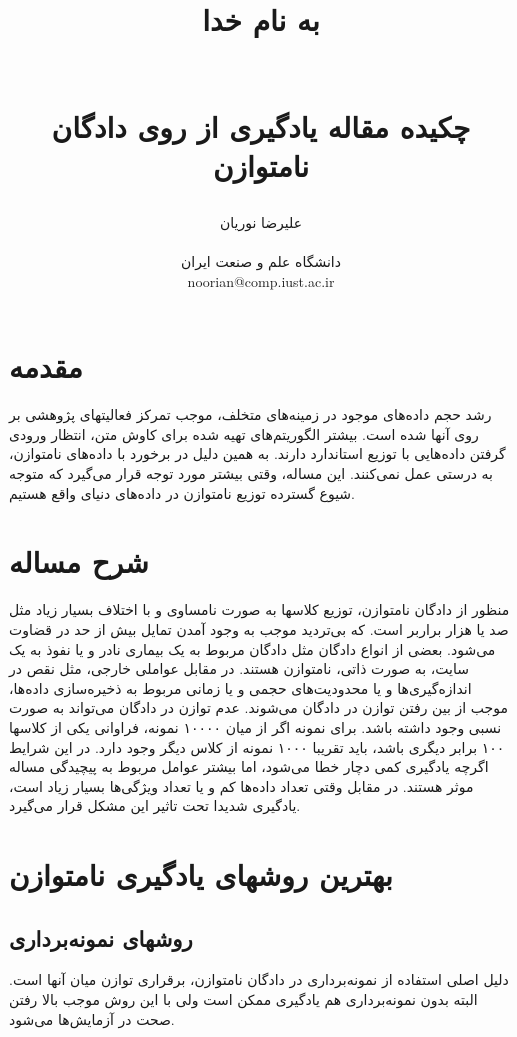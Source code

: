 \documentclass{article}
\title{ 
\begin{normalsize} به نام خدا \end{normalsize}
\\[7cm]
چکیده مقاله یادگیری از روی دادگان نامتوازن
\\[3cm]
}
\author{علیرضا نوریان
\\
\\ \small دانشگاه علم و صنعت ایران
\\ \small noorian@comp.iust.ac.ir
}
\begin{document}
\maketitle

\tableofcontents

\begin{abstract}

\end{abstract}

\section{مقدمه}
رشد حجم داده‌های موجود در زمینه‌های متخلف، موجب تمرکز فعالیتهای پژوهشی بر روی آنها شده است. بیشتر الگوریتم‌های تهیه شده برای کاوش متن، انتظار ورودی گرفتن داده‌هایی با توزیع استاندارد دارند. به همین دلیل در برخورد با داده‌های نامتوازن، به درستی عمل نمی‌کنند. این مساله، وقتی بیشتر مورد توجه قرار می‌گیرد که متوجه شیوع گسترده توزیع نامتوازن در داده‌های دنیای واقع هستیم.
\section{شرح مساله}
منظور از دادگان نامتوازن، توزیع کلاسها به صورت نامساوی و با اختلاف بسیار  زیاد مثل صد یا هزار براربر است. که بی‌تردید موجب به وجود آمدن تمایل بیش از حد در قضاوت می‌شود. بعضی از انواع دادگان مثل دادگان مربوط به یک بیماری نادر و یا نفوذ به یک سایت، به صورت ذاتی، نامتوازن هستند. در مقابل عواملی خارجی، مثل نقص در اندازه‌گیری‌ها و یا محدودیت‌های حجمی و یا زمانی مربوط به ذخیره‌سازی داده‌ها، موجب از بین رفتن توازن در دادگان می‌شوند.
عدم توازن در دادگان می‌تواند به صورت نسبی وجود داشته باشد. برای نمونه اگر از میان ۱۰۰۰۰ نمونه، فراوانی یکی از کلاسها ۱۰۰ برابر دیگری باشد، باید تقریبا ۱۰۰۰ نمونه از کلاس دیگر وجود دارد. در این شرایط اگرچه یادگیری کمی دچار خطا می‌شود، اما بیشتر عوامل مربوط به پیچیدگی مساله موثر هستند. در مقابل وقتی تعداد داده‌ها کم و یا تعداد ویژگی‌ها بسیار زیاد است، یادگیری شدیدا تحت تاثیر این مشکل قرار می‌گیرد.
\section{بهترین روشهای یادگیری نامتوازن}

\subsection{روشهای نمونه‌برداری}
دلیل اصلی استفاده از نمونه‌برداری در دادگان نامتوازن، برقراری توازن میان آنها است. البته بدون نمونه‌برداری هم یادگیری ممکن است ولی با این روش موجب بالا رفتن صحت در آزمایش‌ها می‌شود.
\end{document}
